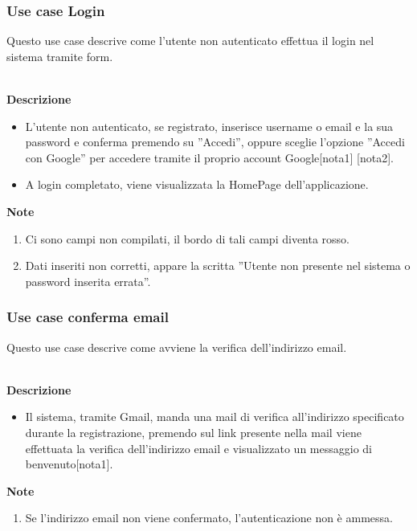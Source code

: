 \documentclass[a4paper,12pt]{article}
\begin{document}
\newpage
\subsubsection*{Use case Login}

Questo use case descrive come l'utente non autenticato effettua il login nel sistema tramite form.

\textbf {\\Descrizione}
\begin{itemize} \setlength\itemsep{0.01em}
\item L'utente non autenticato, se registrato, inserisce username o email e la sua password e conferma premendo su ''Accedi'', oppure sceglie l'opzione ''Accedi con Google'' per accedere tramite il proprio account Google[nota1] [nota2].
\item A login completato, viene visualizzata la HomePage dell'applicazione.
\end{itemize}

\textbf{Note}
\begin{enumerate} \setlength\itemsep{0.01em}
\item Ci sono campi non compilati, il bordo di tali campi diventa rosso.
\item Dati inseriti non corretti, appare la scritta ''Utente non presente nel sistema o password inserita errata''.
\end{enumerate}

\subsubsection*{Use case conferma email}

Questo use case descrive come avviene la verifica dell'indirizzo email.

\textbf{\\Descrizione}
\begin{itemize} \setlength\itemsep{0.01em}
\item Il sistema, tramite Gmail, manda una mail di verifica all'indirizzo specificato durante la registrazione, premendo sul link presente nella mail viene effettuata la verifica dell'indirizzo email e visualizzato un messaggio di benvenuto[nota1].
\end{itemize}

\textbf{Note}
\begin{enumerate} \setlength\itemsep{0.01em}
\item Se l'indirizzo email non viene confermato, l'autenticazione non è ammessa.
\end{enumerate}
\end{document}
